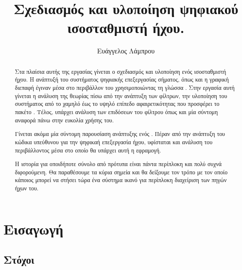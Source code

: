 \documentclass[12pt]{extarticle}
\begin{document}
\begin{titlepage}

\title{Σχεδιασμός και υλοποίηση ψηφιακού ισοσταθμιστή ήχου.}

\author{Ευάγγελος Λάμπρου}
\date{}

\maketitle


\begin{abstract}
    Στα πλαίσια αυτής της εργασίας γίνεται ο σχεδιασμός και υλοποίηση 
    ενός ισοσταθμιστή ήχου. 
    Η ανάπτυξή του συστήματος ψηφιακής επεξεργασίας σήματος, όπως 
    και η γραφική διεπαφή έγιναν μέσα στο περιβάλλον του 
     χρησιμοποιώντας τη γλώσσα . 
    Στην εργασία αυτή γίνεται η ανάλυση της θεωρίας πίσω από την ανάπτυξη των φίλτρων, 
    την υλοποίηση του συστήματος από το χαμηλό έως το υψηλό επίπεδο αφαιρετικότητας που 
    προσφέρει το πακέτο . 
    Τέλος, υπάρχει ανάλυση των επιδόσεων του φίλτρου όπως και μία σύντομη αναφορά πάνω 
    στην ευκολία χρήσης του.

    Γίνεται ακόμα μία σύντομη παρουσίαση ανάπτυξης ενός . Πέραν από
    την ανάπτυξη του κώδικα υπεύθυνου για την ψηφικαή επεξεργασία ήχου, υφίσταται
    και ανάλυση του περιβάλλοντος μέσα στο οποίο θα υπάρχει αυτή η εφραμογή.

    Η ιστορία για οποιδήποτε σύνολο από πρότυπα είναι πάντα περίπλοκη 
    και πολύ συχνά διφορούμενη. Θα παραθέσουμε τα κύρια σημεία 
    και θα δείξουμε τον τρόπο με τον οποίο κάποιος μπορεί να στήσει τώρα ένα σύστημα 
    ικανό για περίπλοκη διαχείριση των πηγών ήχων του. 
\end{abstract}

\tableofcontents

\end{titlepage}


\section{Εισαγωγή}

\subsection{Στόχοι} 
\end{document}
